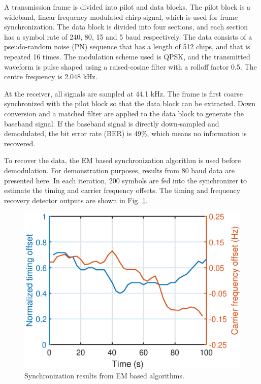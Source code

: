 \documentclass[journal,comsoc]{IEEEtran}
\begin{document}
A transmission frame is divided into pilot and data blocks. The pilot block is a wideband, linear frequency modulated chirp signal, which is used for frame synchronization.
The data block is divided into four sections, and each section has a symbol rate of 240, 80, 15 and 5 baud respectively. The data consists of a pseudo-random noise (PN) sequence that has a length of 512 chips, and that is repeated 16 times.
The modulation scheme used is QPSK, and the transmitted waveform is pulse shaped using a raised-cosine filter with a rolloff factor 0.5. The centre frequency is 2.048 kHz. 

At the receiver, all signals are sampled at 44.1 kHz. The frame is first coarse synchronized with the pilot block so that the data block can be extracted.
Down conversion and a matched filter are applied to the data block to generate the baseband signal.
If the baseband signal is directly down-sampled and demodulated, the bit error rate (BER) is 49\%, which means no information is recovered.

To recover the data, the EM based synchronization algorithm is used before demodulation.
For demonstration purposes, results from 80 baud data are presented here.
In each iteration, 200 symbols are fed into the synchronizer to estimate the timing and carrier frequency offsets. 
The timing and frequency recovery detector outputs are shown in Fig. \ref{fig:per_exp}.

\begin{figure}[ht]
\centering
\includegraphics[width=3 in]{pic/per_exp.eps}
\caption{Synchronization results from EM based algorithms.}
\label{fig:per_exp} 
\end{figure} 
\end{document}
